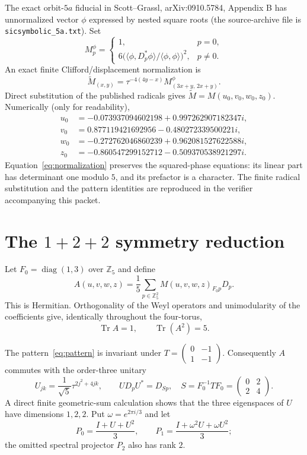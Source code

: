 \documentclass[11pt]{article}
\newcommand{\Z}{\mathbb Z}
\newcommand{\Tr}{\operatorname{Tr}}
\begin{document}
The exact orbit-\(5a\) fiducial in Scott--Grassl, arXiv:0910.5784,
Appendix B has unnormalized vector \(\phi\) expressed by nested square roots
(the source-archive file is \nolinkurl{sicsymbolic_5a.txt}). Set
\[
 M^\phi_p=
 \begin{cases}
 1,&p=0,\\
 6\bigl(\langle\phi,D_p^*\phi\rangle/
               \langle\phi,\phi\rangle\bigr)^2,&p\ne0.
 \end{cases}
\]
An exact finite Clifford/displacement normalization is
\begin{equation}\label{eq:normalization}
 \widetilde M_{(x,y)}
 =\tau^{-4(4y-x)}M^\phi_{(3x+y,\,2x+y)}.
\end{equation}
Direct substitution of the published radicals gives
\(\widetilde M=M(u_0,v_0,w_0,z_0)\). Numerically (only for readability),
\begin{align*}
u_0&=-0.073937094602198+0.997262907182347i,\\
v_0&= 0.877119421692956-0.480272339500221i,\\
w_0&=-0.272762046860239+0.962081527622588i,\\
z_0&=-0.860547299152712-0.509370538921297i.
\end{align*}
Equation~\eqref{eq:normalization} preserves the squared-phase equations: its
linear part has determinant one modulo \(5\), and its prefactor is a
character. The finite radical substitution and the pattern identities are
reproduced in the verifier accompanying this packet.

\section*{The \(1+2+2\) symmetry reduction}

Let \(F_0=\operatorname{diag}(1,3)\) over \(\Z_5\) and define
\begin{equation}\label{eq:A}
 A(u,v,w,z)=\frac15\sum_{p\in\Z_5^2}M(u,v,w,z)_{F_0p}D_p.
\end{equation}
This is Hermitian. Orthogonality of the Weyl operators and unimodularity of
the coefficients give, identically throughout the four-torus,
\begin{equation}\label{eq:automatic}
 \Tr A=1,\qquad \Tr(A^2)=5.
\end{equation}

The pattern~\eqref{eq:pattern} is invariant under
\(T=\left(\begin{smallmatrix}0&-1\\1&-1\end{smallmatrix}\right)\).
Consequently \(A\) commutes with the order-three unitary
\begin{equation}\label{eq:U}
 U_{jk}=\frac1{\sqrt5}\tau^{2j^2+4jk},
 \qquad
 UD_pU^*=D_{Sp},\quad
 S=F_0^{-1}TF_0=
 \begin{pmatrix}0&2\\2&4\end{pmatrix}.
\end{equation}
A direct finite geometric-sum calculation shows that the three eigenspaces of
\(U\) have dimensions \(1,2,2\). Put \(\omega=e^{2\pi i/3}\) and let
\[
 P_0=\frac{I+U+U^2}{3},\qquad
 P_1=\frac{I+\omega^2U+\omega U^2}{3};
\]
the omitted spectral projector \(P_2\) also has rank \(2\).
\end{document}
